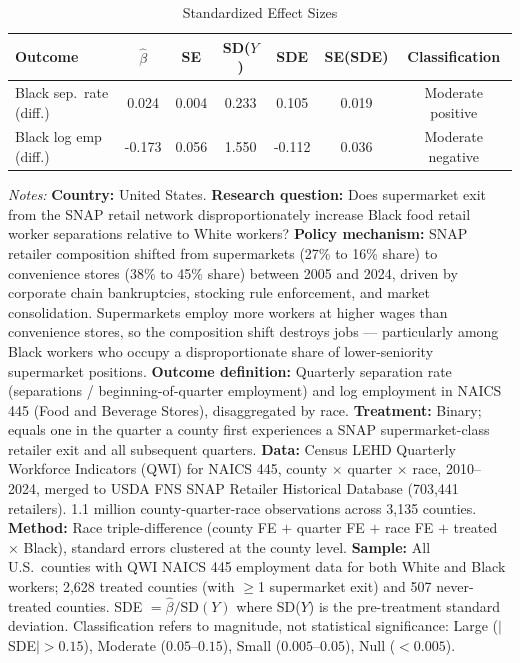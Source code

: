 \begin{table}[htbp]
\centering
\caption{Standardized Effect Sizes}
\label{tab:sde}
\begin{tabular}{lcccccc}
\toprule
Outcome & $\hat{\beta}$ & SE & SD($Y$) & SDE & SE(SDE) & Classification \\
\midrule
Black sep.~rate (diff.) & 0.024 & 0.004 & 0.233 & 0.105 & 0.019 & Moderate positive \\
Black log emp (diff.) & -0.173 & 0.056 & 1.550 & -0.112 & 0.036 & Moderate negative \\
\bottomrule
\end{tabular}
\begin{tablenotes}
\item \textit{Notes:} \textbf{Country:} United States. \textbf{Research question:} Does supermarket exit from the SNAP retail network disproportionately increase Black food retail worker separations relative to White workers? \textbf{Policy mechanism:} SNAP retailer composition shifted from supermarkets (27\% to 16\% share) to convenience stores (38\% to 45\% share) between 2005 and 2024, driven by corporate chain bankruptcies, stocking rule enforcement, and market consolidation. Supermarkets employ more workers at higher wages than convenience stores, so the composition shift destroys jobs --- particularly among Black workers who occupy a disproportionate share of lower-seniority supermarket positions. \textbf{Outcome definition:} Quarterly separation rate (separations / beginning-of-quarter employment) and log employment in NAICS 445 (Food and Beverage Stores), disaggregated by race. \textbf{Treatment:} Binary; equals one in the quarter a county first experiences a SNAP supermarket-class retailer exit and all subsequent quarters. \textbf{Data:} Census LEHD Quarterly Workforce Indicators (QWI) for NAICS 445, county $\times$ quarter $\times$ race, 2010--2024, merged to USDA FNS SNAP Retailer Historical Database (703,441 retailers). 1.1 million county-quarter-race observations across 3,135 counties. \textbf{Method:} Race triple-difference (county FE $+$ quarter FE $+$ race FE $+$ treated $\times$ Black), standard errors clustered at the county level. \textbf{Sample:} All U.S.~counties with QWI NAICS 445 employment data for both White and Black workers; 2,628 treated counties (with $\geq$1 supermarket exit) and 507 never-treated counties. SDE $= \hat{\beta} / \text{SD}(Y)$ where SD($Y$) is the pre-treatment standard deviation. Classification refers to magnitude, not statistical significance: Large ($|$SDE$| > 0.15$), Moderate ($0.05$--$0.15$), Small ($0.005$--$0.05$), Null ($< 0.005$).
\end{tablenotes}
\end{table}
